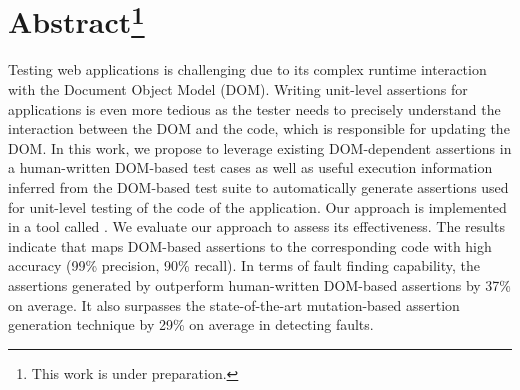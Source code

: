 \section{Abstract\protect\footnote{This work is under preparation.}}
Testing \javascript web applications is challenging due to its complex runtime interaction with the Document Object Model (DOM). Writing unit-level assertions for \javascript applications is even more tedious as the tester needs to precisely understand the interaction between the DOM and the \javascript code, which is responsible for updating the DOM. In this work, we propose to leverage existing DOM-dependent assertions in a human-written DOM-based test cases as well as useful execution information inferred from the DOM-based test suite to automatically generate assertions used for unit-level testing of the \javascript code of the application. Our approach is implemented in a tool called \atrina. We evaluate our approach to assess its effectiveness. The results indicate that \atrina maps DOM-based assertions to the corresponding \javascript code with high accuracy (99\% precision, 90\% recall). In terms of fault finding capability, the assertions generated by \atrina outperform human-written DOM-based assertions by 37\% on average. It also surpasses the state-of-the-art mutation-based assertion generation technique by 29\% on average in detecting faults.
